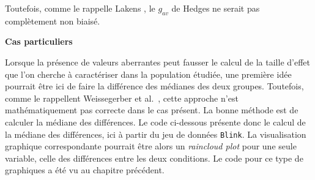 \documentclass[
  french,
]{book}
\newenvironment{Shaded}{\begin{snugshade}}{\end{snugshade}}
\newcommand{\CommentTok}[1]{\textcolor[rgb]{0.56,0.35,0.01}{\textit{#1}}}
\newcommand{\DataTypeTok}[1]{\textcolor[rgb]{0.13,0.29,0.53}{#1}}
\newcommand{\KeywordTok}[1]{\textcolor[rgb]{0.13,0.29,0.53}{\textbf{#1}}}
\newcommand{\NormalTok}[1]{#1}
\newcommand{\OperatorTok}[1]{\textcolor[rgb]{0.81,0.36,0.00}{\textbf{#1}}}
\newcommand{\StringTok}[1]{\textcolor[rgb]{0.31,0.60,0.02}{#1}}
\begin{document}
Toutefois, comme le rappelle Lakens \autocite*{lakensCalculatingReportingEffect2013}, le \(g_{av}\) de Hedges ne serait pas complètement non biaisé.

\textbf{Cas particuliers}

Lorsque la présence de valeurs aberrantes peut fausser le calcul de la taille d'effet que l'on cherche à caractériser dans la population étudiée, une première idée pourrait être ici de faire la différence des médianes des deux groupes. Toutefois, comme le rappellent Weissegerber et al.~\autocite*{weissgerberBarLineGraphs2015}, cette approche n'est mathématiquement pas correcte dans le cas présent. La bonne méthode est de calculer la médiane des différences. Le code ci-dessous présente donc le calcul de la médiane des différences, ici à partir du jeu de données \texttt{Blink}. La visualisation graphique correspondante pourrait être alors un \emph{raincloud plot} pour une seule variable, celle des différences entre les deux conditions. Le code pour ce type de graphiques a été vu au chapitre précédent.

\begin{Shaded}
\end{Shaded}
\end{document}
